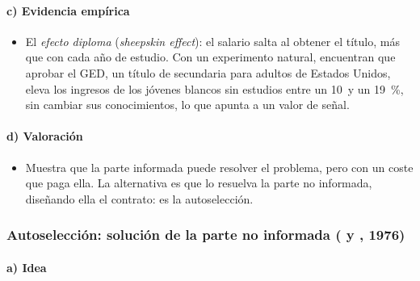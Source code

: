 \documentclass[11pt]{article}
\begin{document}
\paragraph{c) Evidencia empírica}

\begin{itemize}
\item El \emph{efecto diploma} (\emph{sheepskin effect}): el salario salta al obtener el título, más que con cada año de estudio\nocite{HungerfordSolon1987Sheepskin}. Con un experimento natural, \textcite{TylerMurnaneWillett2000Estimating} encuentran que aprobar el GED, un título de secundaria para adultos de Estados Unidos, eleva los ingresos de los jóvenes blancos sin estudios entre un 10~y un 19~\%, sin cambiar sus conocimientos, lo que apunta a un valor de señal.
\end{itemize}

\paragraph{d) Valoración}

\begin{itemize}
\item Muestra que la parte informada puede resolver el problema, pero con un coste que paga ella. La alternativa es que lo resuelva la parte no informada, diseñando ella el contrato: es la autoselección.
\end{itemize}

\subsubsection{Autoselección: solución de la parte no informada ( y , 1976)}\label{sec:autoseleccion}

\paragraph{a) Idea}
\end{document}
